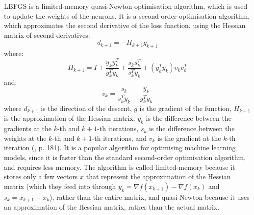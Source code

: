\documentclass[12pt]{report}
\begin{document}
LBFGS is a limited-memory quasi-Newton optimisation algorithm, which is used to update the weights of the neurons. It is a second-order optimisation algorithm, which approximates the second derivative of the loss function, using the Hessian matrix of second derivatives:
\begin{equation}
	d_{k+1} = -H_{k+1}g_{k+1}
\end{equation}
where:
\begin{equation}
	H_{k+1} = I + \frac{y_k y_k^T}{y_k^Ty_k} + \frac{s_k s_k^T}{s_k^Ty_k}+(y_k^Ty_k)v_k v_k^T
\end{equation}
and:
\begin{equation}
	v_k = \frac{s_k}{s_k^Ty_k}-\frac{y_k}{y_k^Ty_k}
\end{equation}
where $d_{k+1}$ is the direction of the descent, $g$ is the gradient of the function, $H_{k+1}$ is the approximation of the Hessian matrix, $y_k$ is the difference between the gradients at the $k$-th and $k+1$-th iterations, $s_k$ is the difference between the weights at the $k$-th and $k+1$-th iterations, and $v_k$ is the gradient at the $k$-th iteration (\cite{pytlak2009}, p. 181).
It is a popular algorithm for optimising machine learning models, since it is faster than the standard second-order optimisation algorithm, and requires less memory. The algorithm is called limited-memory because it stores only a few vectors $x$ that represent the approximation of the Hessian matrix (which they feed into through $y_k = \nabla f(x_{k+1})-\nabla f(x_k)$ and $s_k = x_{k+1}-x_k$), rather than the entire matrix, and quasi-Newton because it uses an approximation of the Hessian matrix, rather than the actual matrix.
\end{document}

